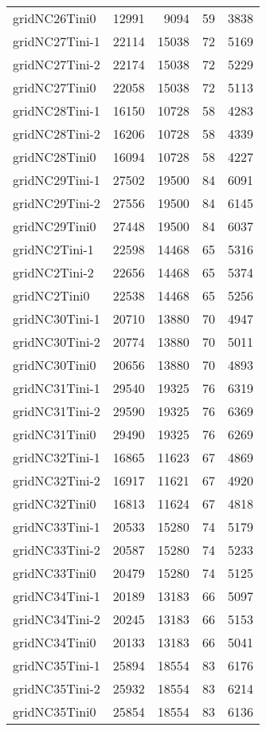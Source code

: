 \begin{tabular}{lrrrr}
gridNC26Tini0 & 12991 & 9094 & 59 & 3838 \\
gridNC27Tini-1 & 22114 & 15038 & 72 & 5169 \\
gridNC27Tini-2 & 22174 & 15038 & 72 & 5229 \\
gridNC27Tini0 & 22058 & 15038 & 72 & 5113 \\
gridNC28Tini-1 & 16150 & 10728 & 58 & 4283 \\
gridNC28Tini-2 & 16206 & 10728 & 58 & 4339 \\
gridNC28Tini0 & 16094 & 10728 & 58 & 4227 \\
gridNC29Tini-1 & 27502 & 19500 & 84 & 6091 \\
gridNC29Tini-2 & 27556 & 19500 & 84 & 6145 \\
gridNC29Tini0 & 27448 & 19500 & 84 & 6037 \\
gridNC2Tini-1 & 22598 & 14468 & 65 & 5316 \\
gridNC2Tini-2 & 22656 & 14468 & 65 & 5374 \\
gridNC2Tini0 & 22538 & 14468 & 65 & 5256 \\
gridNC30Tini-1 & 20710 & 13880 & 70 & 4947 \\
gridNC30Tini-2 & 20774 & 13880 & 70 & 5011 \\
gridNC30Tini0 & 20656 & 13880 & 70 & 4893 \\
gridNC31Tini-1 & 29540 & 19325 & 76 & 6319 \\
gridNC31Tini-2 & 29590 & 19325 & 76 & 6369 \\
gridNC31Tini0 & 29490 & 19325 & 76 & 6269 \\
gridNC32Tini-1 & 16865 & 11623 & 67 & 4869 \\
gridNC32Tini-2 & 16917 & 11621 & 67 & 4920 \\
gridNC32Tini0 & 16813 & 11624 & 67 & 4818 \\
gridNC33Tini-1 & 20533 & 15280 & 74 & 5179 \\
gridNC33Tini-2 & 20587 & 15280 & 74 & 5233 \\
gridNC33Tini0 & 20479 & 15280 & 74 & 5125 \\
gridNC34Tini-1 & 20189 & 13183 & 66 & 5097 \\
gridNC34Tini-2 & 20245 & 13183 & 66 & 5153 \\
gridNC34Tini0 & 20133 & 13183 & 66 & 5041 \\
gridNC35Tini-1 & 25894 & 18554 & 83 & 6176 \\
gridNC35Tini-2 & 25932 & 18554 & 83 & 6214 \\
gridNC35Tini0 & 25854 & 18554 & 83 & 6136 \\

\end{tabular}
